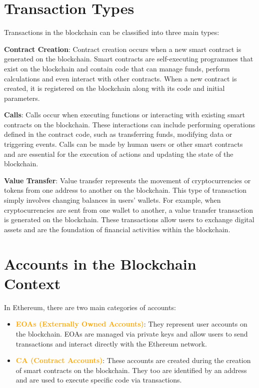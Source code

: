 \section{Transaction Types}

Transactions in the blockchain can be classified into three main types:

\begin{remark2}
\textbf{Contract Creation}:
Contract creation occurs when a new smart contract is generated on the blockchain. Smart contracts are self-executing programmes that exist on the blockchain and contain code that can manage funds, perform calculations and even interact with other contracts. When a new contract is created, it is registered on the blockchain along with its code and initial parameters.
\end{remark2}

\begin{remark}
\textbf{Calls}:
Calls occur when executing functions or interacting with existing smart contracts on the blockchain. These interactions can include performing operations defined in the contract code, such as transferring funds, modifying data or triggering events. Calls can be made by human users or other smart contracts and are essential for the execution of actions and updating the state of the blockchain.
\end{remark}

\begin{remark2}
\textbf{Value Transfer}:
Value transfer represents the movement of cryptocurrencies or tokens from one address to another on the blockchain. This type of transaction simply involves changing balances in users' wallets. For example, when cryptocurrencies are sent from one wallet to another, a value transfer transaction is generated on the blockchain. These transactions allow users to exchange digital assets and are the foundation of financial activities within the blockchain.
\end{remark2}

\section{Accounts in the Blockchain Context}

In Ethereum, there are two main categories of accounts:

\begin{itemize}
    \item \textbf{\textcolor{Orange}{EOAs (Externally Owned Accounts)}}: They represent user accounts on the blockchain. EOAs are managed via private keys and allow users to send transactions and interact directly with the Ethereum network.
    \item \textbf{\textcolor{Orange}{CA (Contract Accounts)}}: These accounts are created during the creation of smart contracts on the blockchain. They too are identified by an address and are used to execute specific code via transactions.
\end{itemize}

